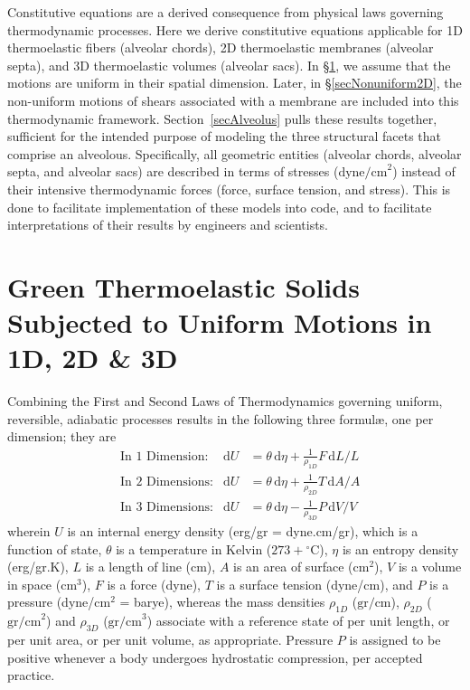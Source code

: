 Constitutive equations are a derived consequence from physical laws governing thermo\-dynamic processes.  Here we derive constitutive equations applicable for 1D thermo\-elastic fibers (alveolar chords), 2D thermo\-elastic membranes (alveolar septa), and 3D thermo\-elastic volumes (alveolar sacs).  In \S\ref{secUniformCE}, we assume that the motions are uniform in their spatial dimension.  Later, in \S\ref{secNonuniform2D}, the non-uniform motions of shears associated with a membrane are included into this thermo\-dynamic framework.  Section~\ref{secAlveolus} pulls these results together, sufficient for the intended purpose of modeling the three structural facets that comprise an alveolous.  Specifically, all geometric entities (alveolar chords, alveolar septa, and alveolar sacs) are described in terms of stresses ($\text{dyne/cm}^2$) instead of their intensive thermo\-dynamic forces (force, surface tension, and stress).  This is done to facilitate implementation of these models into code, and to facilitate interpretations of their results by engineers and scientists.

\section{Green Thermoelastic Solids Subjected to Uniform Motions in 1D, 2D \& 3D}
\label{secUniformCE}

Combining the First and Second Laws of Thermo\-dynamics governing uniform, reversible, adiabatic processes results in the following three formul\ae, one per dimension; they are
\begin{subequations}
    \label{thermoelasticLaws}
    \begin{align}
    \mbox{} & \text{In 1 Dimension:} & 
    \mathrm{d}U & = \theta \, \mathrm{d} \eta +
    \tfrac{1}{\rho_{1D}} F \, \mathrm{d}L / L
    \label{thermoelastic1Dlaw} \\
    \mbox{} & \text{In 2 Dimensions:} &
    \mathrm{d}U & = \theta \, \mathrm{d} \eta + 
    \tfrac{1}{\rho_{2D}} T \, \mathrm{d}A / \! A
    \label{thermoelastic2Dlaw} \\
    \mbox{} & \text{In 3 Dimensions:} &
    \mathrm{d}U & = \theta \, \mathrm{d} \eta - 
    \tfrac{1}{\rho_{3D}} P \, \mathrm{d}V \! / V \!
    \label{thermoelastic3Dlaw}
    \end{align}
\end{subequations}
wherein $U$ is an internal energy density (erg/gr = dyne.cm/gr), which is a function of state, $\theta$ is a temperature in Kelvin ($273 + \mbox{}^{\circ}$C), $\eta$ is an entropy density (erg/gr.K), $L$ is a length of line (cm), $A$ is an area of surface ($\text{cm}^2$), $V$ is a volume in space ($\text{cm}^3$), $F$ is a force (dyne), $T$ is a surface tension (dyne/cm), and $P$ is a pressure (dyne/$\text{cm}^2$ = barye), whereas the mass densities $\rho_{1D}$ ($\text{gr/cm}$), $\rho_{2D}$ ($\text{gr/cm}^2$) and $\rho_{3D}$ ($\text{gr/cm}^3$) associate with a reference state of per unit length, or per unit area, or per unit volume, as appropriate.  Pressure $P$ is assigned to be positive whenever a body undergoes hydro\-static compression, per accepted practice.

